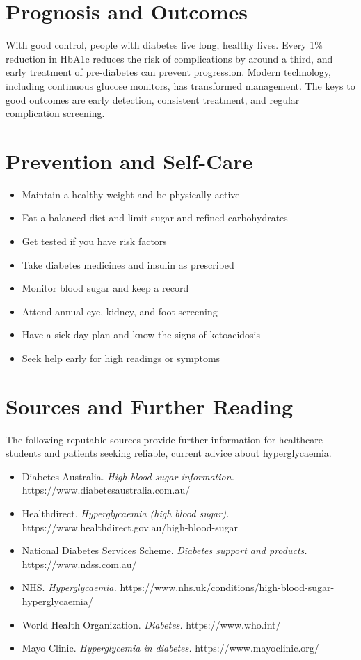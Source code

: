 \section*{Prognosis and Outcomes}
With good control, people with diabetes live long, healthy lives. Every 1\% reduction in HbA1c reduces the risk of complications by around a third, and early treatment of pre-diabetes can prevent progression. Modern technology, including continuous glucose monitors, has transformed management. The keys to good outcomes are early detection, consistent treatment, and regular complication screening.

\section*{Prevention and Self-Care}
\begin{itemize}
    \item Maintain a healthy weight and be physically active
    \item Eat a balanced diet and limit sugar and refined carbohydrates
    \item Get tested if you have risk factors
    \item Take diabetes medicines and insulin as prescribed
    \item Monitor blood sugar and keep a record
    \item Attend annual eye, kidney, and foot screening
    \item Have a sick-day plan and know the signs of ketoacidosis
    \item Seek help early for high readings or symptoms
\end{itemize}

\section*{Sources and Further Reading}
The following reputable sources provide further information for healthcare students and patients seeking reliable, current advice about hyperglycaemia.

\begin{itemize}
    \item Diabetes Australia. \textit{High blood sugar information.} https://www.diabetesaustralia.com.au/
    \item Healthdirect. \textit{Hyperglycaemia (high blood sugar).} https://www.healthdirect.gov.au/high-blood-sugar
    \item National Diabetes Services Scheme. \textit{Diabetes support and products.} https://www.ndss.com.au/
    \item NHS. \textit{Hyperglycaemia.} https://www.nhs.uk/conditions/high-blood-sugar-hyperglycaemia/
    \item World Health Organization. \textit{Diabetes.} https://www.who.int/
    \item Mayo Clinic. \textit{Hyperglycemia in diabetes.} https://www.mayoclinic.org/
\end{itemize}
